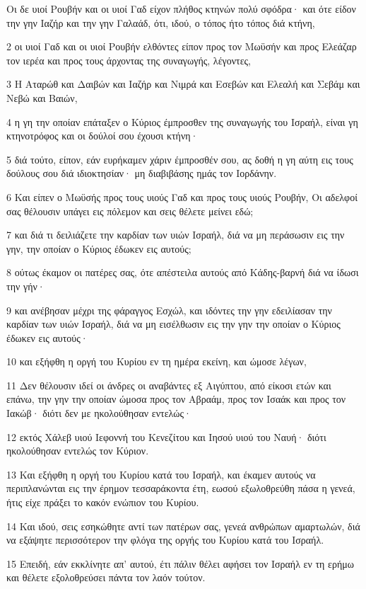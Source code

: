 \par Οι δε υιοί Ρουβήν και οι υιοί Γαδ είχον πλήθος κτηνών πολύ σφόδρα· και ότε είδον την γην Ιαζήρ και την γην Γαλαάδ, ότι, ιδού, ο τόπος ήτο τόπος διά κτήνη,
\par 2 οι υιοί Γαδ και οι υιοί Ρουβήν ελθόντες είπον προς τον Μωϋσήν και προς Ελεάζαρ τον ιερέα και προς τους άρχοντας της συναγωγής, λέγοντες,
\par 3 Η Αταρώθ και Δαιβών και Ιαζήρ και Νιμρά και Εσεβών και Ελεαλή και Σεβάμ και Νεβώ και Βαιών,
\par 4 η γη την οποίαν επάταξεν ο Κύριος έμπροσθεν της συναγωγής του Ισραήλ, είναι γη κτηνοτρόφος και οι δούλοί σου έχουσι κτήνη·
\par 5 διά τούτο, είπον, εάν ευρήκαμεν χάριν έμπροσθέν σου, ας δοθή η γη αύτη εις τους δούλους σου διά ιδιοκτησίαν· μη διαβιβάσης ημάς τον Ιορδάνην.
\par 6 Και είπεν ο Μωϋσής προς τους υιούς Γαδ και προς τους υιούς Ρουβήν, Οι αδελφοί σας θέλουσιν υπάγει εις πόλεμον και σεις θέλετε μείνει εδώ;
\par 7 και διά τι δειλιάζετε την καρδίαν των υιών Ισραήλ, διά να μη περάσωσιν εις την γην, την οποίαν ο Κύριος έδωκεν εις αυτούς;
\par 8 ούτως έκαμον οι πατέρες σας, ότε απέστειλα αυτούς από Κάδης-βαρνή διά να ίδωσι την γήν·
\par 9 και ανέβησαν μέχρι της φάραγγος Εσχώλ, και ιδόντες την γην εδειλίασαν την καρδίαν των υιών Ισραήλ, διά να μη εισέλθωσιν εις την γην την οποίαν ο Κύριος έδωκεν εις αυτούς·
\par 10 και εξήφθη η οργή του Κυρίου εν τη ημέρα εκείνη, και ώμοσε λέγων,
\par 11 Δεν θέλουσιν ιδεί οι άνδρες οι αναβάντες εξ Αιγύπτου, από είκοσι ετών και επάνω, την γην την οποίαν ώμοσα προς τον Αβραάμ, προς τον Ισαάκ και προς τον Ιακώβ· διότι δεν με ηκολούθησαν εντελώς·
\par 12 εκτός Χάλεβ υιού Ιεφοννή του Κενεζίτου και Ιησού υιού του Ναυή· διότι ηκολούθησαν εντελώς τον Κύριον.
\par 13 Και εξήφθη η οργή του Κυρίου κατά του Ισραήλ, και έκαμεν αυτούς να περιπλανώνται εις την έρημον τεσσαράκοντα έτη, εωσού εξωλοθρεύθη πάσα η γενεά, ήτις είχε πράξει το κακόν ενώπιον του Κυρίου.
\par 14 Και ιδού, σεις εσηκώθητε αντί των πατέρων σας, γενεά ανθρώπων αμαρτωλών, διά να εξάψητε περισσότερον την φλόγα της οργής του Κυρίου κατά του Ισραήλ.
\par 15 Επειδή, εάν εκκλίνητε απ' αυτού, έτι πάλιν θέλει αφήσει τον Ισραήλ εν τη ερήμω και θέλετε εξολοθρεύσει πάντα τον λαόν τούτον.
